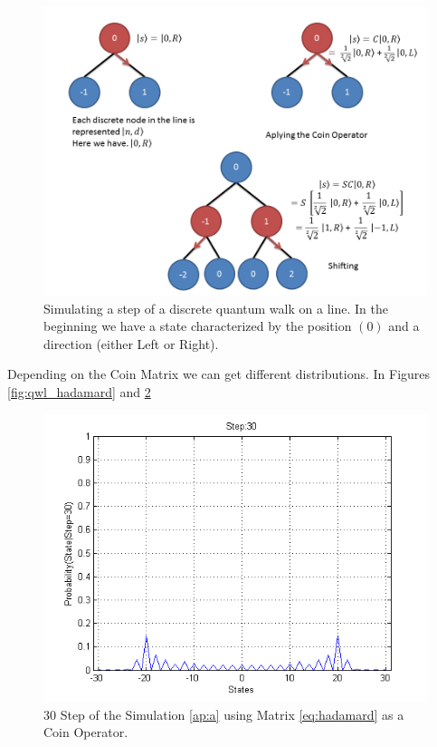 \begin{figure}[h]
\centering 

\includegraphics[scale=0.50]{Figures/quantum_walk_line.png}
\caption{Simulating a step of a discrete quantum walk on a line. In the beginning we have a state characterized by the position $(0)$ and a direction (either Left or Right).}
\label{fig:qwl_tree}
\end{figure}


Depending on the Coin Matrix we can get different distributions. In Figures \ref{fig:qwl_hadamard} and \ref{fig:qwl_symetric}

\begin{figure}[h]
\centering 
\includegraphics[scale=0.50]{Figures/quantum_walk_line_symetric.png}
\caption{30 Step of the Simulation \ref{ap:a} using Matrix \ref{eq:hadamard} as a Coin Operator.}
\label{fig:qwl_symetric}
\end{figure}

